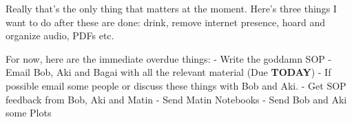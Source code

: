 \noindent {}

Really that's the only thing that matters at the moment. Here's three things I want to do after these are done: drink, remove internet presence, hoard and organize audio, PDFs etc.

For now, here are the immediate overdue things:
- Write the goddamn SOP
- Email Bob, Aki and Bagai with all the relevant material (Due \textbf{TODAY})
- If possible email some people or discuss these things with Bob and Aki. 
- Get SOP feedback from Bob, Aki and Matin
- Send Matin Notebooks
- Send Bob and Aki some Plots